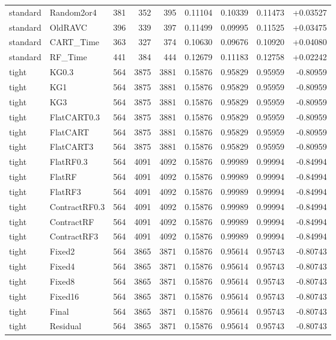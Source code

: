 \begin{longtable}{@{}llrrrrrrr@{}}
standard & Random2or4 & 381 & 352 & 395 & 0.11104 & 0.10339 & 0.11473 & +0.03527\\
standard & OldRAVC & 396 & 339 & 397 & 0.11499 & 0.09995 & 0.11525 & +0.03475\\
standard & CART\_Time & 363 & 327 & 374 & 0.10630 & 0.09676 & 0.10920 & +0.04080\\
standard & RF\_Time & 441 & 384 & 444 & 0.12679 & 0.11183 & 0.12758 & +0.02242\\
tight & KG0.3 & 564 & 3875 & 3881 & 0.15876 & 0.95829 & 0.95959 & -0.80959\\
tight & KG1 & 564 & 3875 & 3881 & 0.15876 & 0.95829 & 0.95959 & -0.80959\\
tight & KG3 & 564 & 3875 & 3881 & 0.15876 & 0.95829 & 0.95959 & -0.80959\\
tight & FlatCART0.3 & 564 & 3875 & 3881 & 0.15876 & 0.95829 & 0.95959 & -0.80959\\
tight & FlatCART & 564 & 3875 & 3881 & 0.15876 & 0.95829 & 0.95959 & -0.80959\\
tight & FlatCART3 & 564 & 3875 & 3881 & 0.15876 & 0.95829 & 0.95959 & -0.80959\\
tight & FlatRF0.3 & 564 & 4091 & 4092 & 0.15876 & 0.99989 & 0.99994 & -0.84994\\
tight & FlatRF & 564 & 4091 & 4092 & 0.15876 & 0.99989 & 0.99994 & -0.84994\\
tight & FlatRF3 & 564 & 4091 & 4092 & 0.15876 & 0.99989 & 0.99994 & -0.84994\\
tight & ContractRF0.3 & 564 & 4091 & 4092 & 0.15876 & 0.99989 & 0.99994 & -0.84994\\
tight & ContractRF & 564 & 4091 & 4092 & 0.15876 & 0.99989 & 0.99994 & -0.84994\\
tight & ContractRF3 & 564 & 4091 & 4092 & 0.15876 & 0.99989 & 0.99994 & -0.84994\\
tight & Fixed2 & 564 & 3865 & 3871 & 0.15876 & 0.95614 & 0.95743 & -0.80743\\
tight & Fixed4 & 564 & 3865 & 3871 & 0.15876 & 0.95614 & 0.95743 & -0.80743\\
tight & Fixed8 & 564 & 3865 & 3871 & 0.15876 & 0.95614 & 0.95743 & -0.80743\\
tight & Fixed16 & 564 & 3865 & 3871 & 0.15876 & 0.95614 & 0.95743 & -0.80743\\
tight & Final & 564 & 3865 & 3871 & 0.15876 & 0.95614 & 0.95743 & -0.80743\\
tight & Residual & 564 & 3865 & 3871 & 0.15876 & 0.95614 & 0.95743 & -0.80743\\

\end{longtable}
